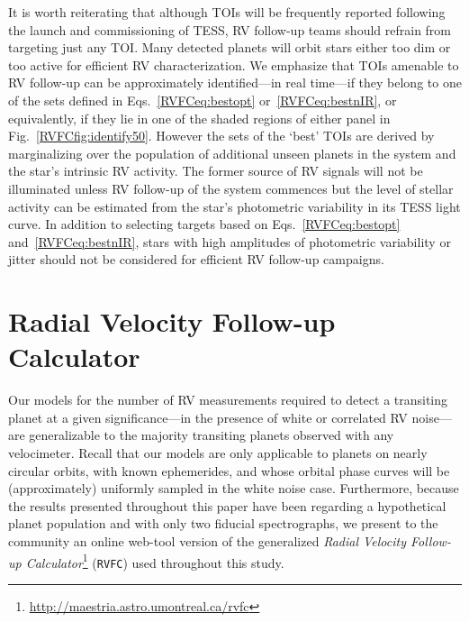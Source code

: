 It is worth reiterating that although TOIs will be frequently reported following the launch and
commissioning of TESS, RV follow-up teams should refrain from targeting just any TOI. Many detected
planets will orbit stars either too dim or too active for efficient RV characterization. We emphasize
that TOIs amenable to RV follow-up can be approximately identified---in real time---if they belong
to one of the sets defined in Eqs.~\ref{RVFCeq:bestopt} or~\ref{RVFCeq:bestnIR}, or equivalently, if they lie
in one of the shaded regions of either panel in Fig.~\ref{RVFCfig:identify50}. However the sets of the
`best' TOIs are derived by marginalizing over the population of additional unseen planets in the
system and the star's intrinsic RV activity. The former source of RV signals will not be illuminated
unless RV follow-up of the system commences but the level of stellar activity can be estimated
from the star's photometric variability in its TESS light curve. In addition to selecting targets
based on Eqs.~\ref{RVFCeq:bestopt} and~\ref{RVFCeq:bestnIR}, stars with high amplitudes of photometric
variability or jitter should not be considered for efficient RV follow-up campaigns.



\appendix
\section{Radial Velocity Follow-up Calculator} \label{RVFCapp:rvfc}
Our models for the number of RV measurements \nrv{} required to detect a transiting planet
at a given
significance---in the presence of white or correlated RV noise---are generalizable to the majority
transiting planets observed with any velocimeter. Recall that our models are only applicable to
planets on nearly circular orbits, with known ephemerides, and 
whose orbital phase curves will be (approximately) uniformly sampled in the white noise case.
Furthermore, because the results presented throughout this paper
have been regarding a hypothetical planet population and with only two fiducial spectrographs,
we present to the community an online web-tool version of the generalized
\emph{Radial Velocity Follow-up Calculator}\footnote{\url{http://maestria.astro.umontreal.ca/rvfc}}
(\texttt{RVFC}) used throughout this study.

